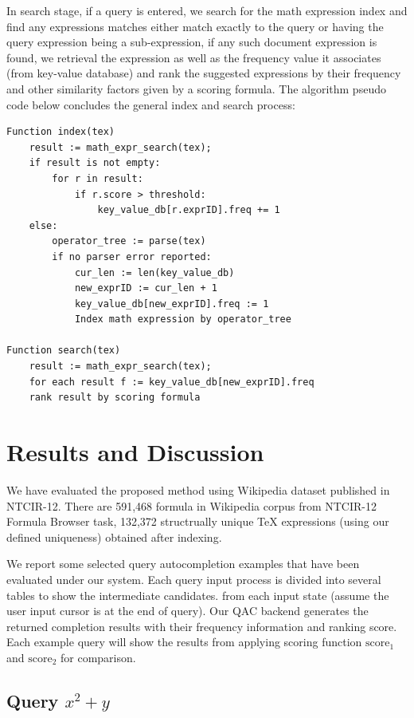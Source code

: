 \documentclass[12pt]{article} %
\begin{document}
In search stage, if a query is entered, we search for the math expression index and find any expressions
matches either match exactly to the query or having the query expression being a sub-expression, if any
such document expression is found, we retrieval the expression as well as the frequency value it
associates (from key-value database) and rank the suggested expressions by their frequency and other similarity factors given by a scoring formula.
%
The algorithm pseudo code below concludes the general index and search process:
\vspace{0.5cm}
\begin{lstlisting}
Function index(tex)
    result := math_expr_search(tex);
    if result is not empty:
        for r in result:
            if r.score > threshold:
                key_value_db[r.exprID].freq += 1
    else:
        operator_tree := parse(tex)
        if no parser error reported:
            cur_len := len(key_value_db)
            new_exprID := cur_len + 1
            key_value_db[new_exprID].freq := 1
            Index math expression by operator_tree

Function search(tex)
    result := math_expr_search(tex);
    for each result f := key_value_db[new_exprID].freq
    rank result by scoring formula
\end{lstlisting}

\section{Results and Discussion}
We have evaluated the proposed method using Wikipedia dataset published in NTCIR-12.
There are 591,468 formula in Wikipedia corpus from NTCIR-12 Formula Browser
task, 132,372 structrually unique TeX expressions (using our defined uniqueness) obtained
after indexing.

We report some selected query autocompletion examples that have been evaluated under our system.
Each query input process is divided into several tables to show the intermediate candidates. 
from each input state (assume the user input cursor is at the end of query).
Our QAC backend generates the returned completion results with their frequency information and ranking score.
Each example query will show the results from applying scoring function $\text{score}_1$ and $\text{score}_2$ for comparison.

\subsection{Query $x^2+y$}
\end{document}
